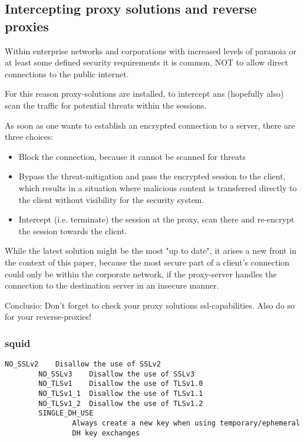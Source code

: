 \subsection{Intercepting proxy solutions and reverse proxies}

Within enterprise networks and corporations with increased levels of paranoia or at least some defined security requirements it is common, NOT to allow direct connections to the public internet.

For this reason proxy-solutions are installed, to intercept ans (hopefully also) scan the traffic for potential threats within the sessions.

As soon as one wants to establish an encrypted connection to a server, there are three choices:

\begin{itemize}
\item Block the connection, because it cannot be scanned for threats
\item Bypass the threat-mitigation and pass the encrypted session to the client, which results in a situation where malicious content is transferred directly to the client without visibility for the security system.
\item Intercept (i.e. terminate) the session at the proxy, scan there and re-encrypt the session towards the client.
\end{itemize}

While the latest solution might be the most "up to date", it arises a new front in the context of this paper, because the most secure part of a client's connection could only be within the corporate network, if the proxy-server handles the connection to the destination server in an insecure manner.

Conclusio: Don't forget to check your proxy solutions ssl-capabilities. Also do so for your reverse-proxies!

\subsubsection{squid}

\begin{lstlisting}[breaklines]
		NO_SSLv2    Disallow the use of SSLv2
		NO_SSLv3    Disallow the use of SSLv3
		NO_TLSv1    Disallow the use of TLSv1.0
		NO_TLSv1_1  Disallow the use of TLSv1.1
		NO_TLSv1_2  Disallow the use of TLSv1.2
		SINGLE_DH_USE
				Always create a new key when using temporary/ephemeral
				DH key exchanges
\end{lstlisting}

